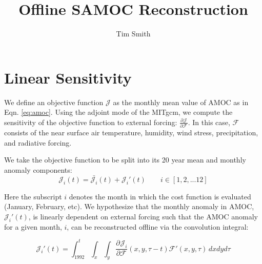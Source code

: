 \documentclass[a4paper,11pt]{article}
\title{\vspace{-10ex}Offline SAMOC Reconstruction}
\author{Tim Smith}
\date{\vspace{-3ex}}
\newcommand{\pderiv}[3][]{%
  \ensuremath{\frac{\partial^{#1} {#2}}{\partial {#3}^{#1}}}}
\begin{document}
\maketitle
  \section{Linear Sensitivity}
  \label{linearSensitivity}
  
  We define an objective function $\mathcal{J}$ as the monthly mean value of AMOC as in Eqn. \ref{eq:amoc}. Using the adjoint mode of the MITgcm, we compute the sensitivity of the objective function to external forcing: $\pderiv{\mathcal{J}}{\mathcal{F}}$. In this case, $\mathcal{F}$ consists of the near surface air temperature, humidity, wind stress, precipitation, and radiative forcing.  
	
  We take the objective function to be split into its 20 year mean and monthly anomaly components: 
	\begin{equation}
	  \mathcal{J}_i(t) = \bar{\mathcal{J}_i}(t) + \mathcal{J}_i'(t) \qquad i \in [1, 2, ... 12]
	\end{equation}

  Here the subscript $i$ denotes the month in which the cost function is evaluated (January, February, etc). We hypothesize that the monthly anomaly in AMOC, $\mathcal{J}_i'(t)$, is linearly dependent on external forcing such that the AMOC anomaly for a given month, $i$, can be reconstructed offline via the convolution integral:
 
	\begin{equation}
	  \mathcal{J}_i'(t) = \int_{1992}^{t}\int_x \int_y\pderiv{\mathcal{J}_i}{\mathcal{F}}(x,y,\tau-t)\mathcal{F}'(x,y,\tau)\, dxdyd\tau  
	\end{equation}

  
   
  
  
\end{document}
